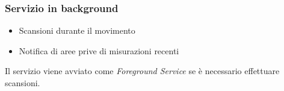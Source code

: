 \documentclass{beamer}
\begin{document}
\begin{frame}
    \frametitle{Servizio in background}

    \begin{itemize}
        \item Scansioni durante il movimento
        \item Notifica di aree prive di misurazioni recenti
    \end{itemize}

    Il servizio viene avviato come \textit{Foreground Service} se è necessario effettuare scansioni.

    \begin{figure}[H]
        \hspace*{1cm}
    \end{figure}
\end{frame}
\end{document}
